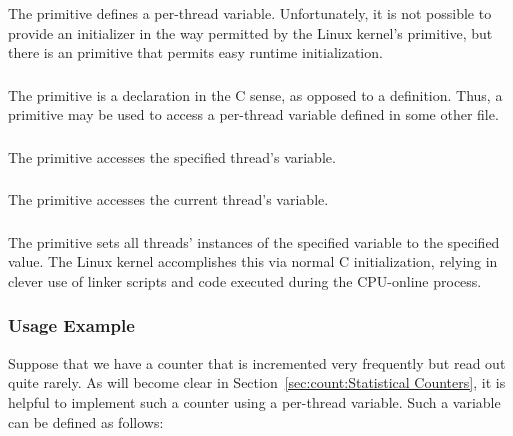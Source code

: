 \subsubsection{}

The  primitive defines a per-thread variable.
Unfortunately, it is not possible to provide an initializer in the way
permitted by the Linux kernel's  primitive,
but there is an  primitive that permits easy
runtime initialization.

\subsubsection{}

The  primitive is a declaration in the C sense,
as opposed to a definition.
Thus, a  primitive may be used to access
a per-thread variable defined in some other file.

\subsubsection{}

The  primitive accesses the specified thread's variable.

\subsubsection{}

The  primitive accesses the current thread's variable.

\subsubsection{}

The  primitive sets all threads' instances of
the specified variable to the specified value.
The Linux kernel accomplishes this via normal C initialization,
relying in clever use of linker scripts and code executed during
the CPU-online process.

\subsubsection{Usage Example}

Suppose that we have a counter that is incremented very frequently
but read out quite rarely.
As will become clear in
Section~\ref{sec:count:Statistical Counters},
it is helpful to implement such a counter using a per-thread variable.
Such a variable can be defined as follows:

